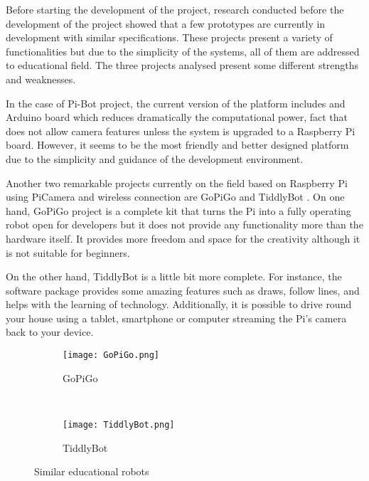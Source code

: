 Before starting the development of the project, research conducted before the development of the project showed that a few prototypes are currently in development with similar specifications. These projects present a variety of functionalities but due to the simplicity of the systems, all of them are addressed to educational field. The three projects analysed present some different strengths and weaknesses. 

In the case of Pi-Bot \cite{PiBot} project, the current version of the platform includes and Arduino board which reduces dramatically the computational power, fact that does not allow camera features unless the system is upgraded to a Raspberry Pi board. However, it seems to be the most friendly and better designed platform due to the simplicity and guidance of the development environment.

Another two remarkable projects currently on the field based on Raspberry Pi using PiCamera and wireless connection are GoPiGo \cite{GoPiGo} and TiddlyBot \cite{TiddlyBot}. On one hand, GoPiGo project is a complete kit that turns the Pi into a fully operating robot open for developers but it does not provide any functionality more than the hardware itself. It provides more freedom and space for the creativity although it is not suitable for beginners.

On the other hand, TiddlyBot is a little bit more complete. For instance, the software package provides some amazing features such as draws, follow lines, and helps with the learning of technology. Additionally, it is possible to drive round your house using a tablet, smartphone or computer streaming the Pi's camera back to your device.

\begin{figure}
     \centering
     \begin{subfigure}[b]{0.3\textwidth}
             \texttt{[image: GoPiGo.png]}
             \caption{GoPiGo}
             \label{fig:GoPiGo}
     \end{subfigure}%
     ~
     \begin{subfigure}[b]{0.3\textwidth}
             \texttt{[image: TiddlyBot.png]}
             \caption{TiddlyBot}
             \label{fig:TiddlyBot}
     \end{subfigure}
     \caption{Similar educational robots}\label{fig:robots}
\end{figure}